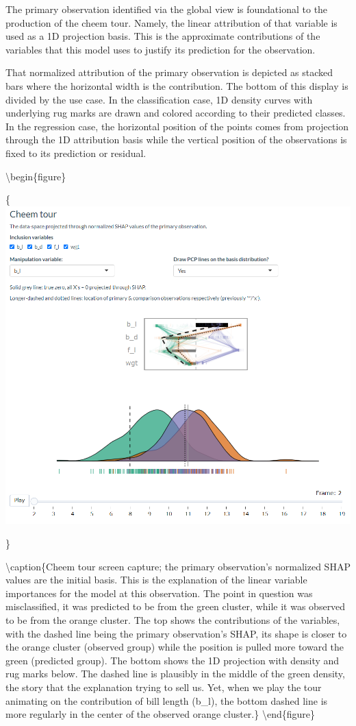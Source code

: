 \documentclass[
]{article}
\begin{document}
The primary observation identified via the global view is foundational to the production of the cheem tour. Namely, the linear attribution of that variable is used as a 1D projection basis. This is the approximate contributions of the variables that this model uses to justify its prediction for the observation.

That normalized attribution of the primary observation is depicted as stacked bars where the horizontal width is the contribution. The bottom of this display is divided by the use case. In the classification case, 1D density curves with underlying rug marks are drawn and colored according to their predicted classes. In the regression case, the horizontal position of the points comes from projection through the 1D attribution basis while the vertical position of the observations is fixed to its prediction or residual.

\textbackslash begin\{figure\}

\{\centering \includegraphics[width=1\linewidth]{./figures/cheem_tour_penguins}

\}

\textbackslash caption\{Cheem tour screen capture; the primary observation's normalized SHAP values are the initial basis. This is the explanation of the linear variable importances for the model at this observation. The point in question was misclassified, it was predicted to be from the green cluster, while it was observed to be from the orange cluster. The top shows the contributions of the variables, with the dashed line being the primary observation's SHAP, its shape is closer to the orange cluster (observed group) while the position is pulled more toward the green (predicted group). The bottom shows the 1D projection with density and rug marks below. The dashed line is plausibly in the middle of the green density, the story that the explanation trying to sell us. Yet, when we play the tour animating on the contribution of bill length (b\_l), the bottom dashed line is more regularly in the center of the observed orange cluster.\}\label{fig:cheemtour}
\textbackslash end\{figure\}
\end{document}
